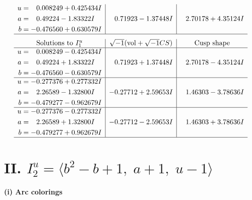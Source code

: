 \documentclass[1p]{elsarticle_modified}
\theoremstyle{definition}
\newcommand{\I}{\sqrt{-1}}
\begin{document}
$$\begin{array}{c|c|c}
\begin{aligned}
u &= \phantom{-}0.008249 + 0.425434 I \\
a &= \phantom{-}0.49224 - 1.83322 I \\
b &= -0.476560 + 0.630579 I\end{aligned}
 & \phantom{-}0.71923 - 1.37448 I & \phantom{-}2.70178 + 4.35124 I\\
 \hline 
 \end{array}$$\newpage$$\begin{array}{c|c|c}  
\text{Solutions to }I^u_{1}& \I (\text{vol} + \sqrt{-1}CS) & \text{Cusp shape}\\
 \hline 
\begin{aligned}
u &= \phantom{-}0.008249 - 0.425434 I \\
a &= \phantom{-}0.49224 + 1.83322 I \\
b &= -0.476560 - 0.630579 I\end{aligned}
 & \phantom{-}0.71923 + 1.37448 I & \phantom{-}2.70178 - 4.35124 I \\ \hline\begin{aligned}
u &= -0.277376 + 0.277332 I \\
a &= \phantom{-}2.26589 - 1.32800 I \\
b &= -0.479277 - 0.962679 I\end{aligned}
 & -0.27712 + 2.59653 I & \phantom{-}1.46303 - 3.78636 I \\ \hline\begin{aligned}
u &= -0.277376 - 0.277332 I \\
a &= \phantom{-}2.26589 + 1.32800 I \\
b &= -0.479277 + 0.962679 I\end{aligned}
 & -0.27712 - 2.59653 I & \phantom{-}1.46303 + 3.78636 I\\
 \hline 
 \end{array}$$\newpage\newpage\renewcommand{\arraystretch}{1}
\centering \section*{II. $I^u_{2}= \langle b^2- b+1,\;a+1,\;u-1 \rangle$}
\flushleft \textbf{(i) Arc colorings}\\
\end{document}
